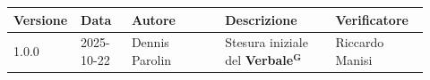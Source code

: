 \documentclass[a4paper,12pt]{article}
\newcommand{\term}[1]{\textbf{#1}$^\mathbf{G}$}
\begin{document}
\begin{center}
\small
\renewcommand{\arraystretch}{1.2} 
\begin{tabular}{|p{0.1\linewidth}|p{0.12\linewidth}|p{0.22\linewidth}|p{0.26\linewidth}|p{0.22\linewidth}|}
\hline
\rowcolor{gray!60} 
\textbf{Versione} & \textbf{Data} & \textbf{Autore} & \textbf{Descrizione} & \textbf{Verificatore} \\
\hline
\rowcolor{white}
1.0.0 & 2025-10-22 & Dennis Parolin & Stesura iniziale del \term{Verbale} & Riccardo Manisi \\
\hline
\end{tabular}
\end{center}
\end{document}
